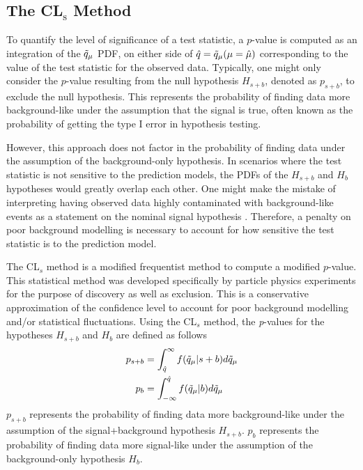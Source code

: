 \subsection{The CL$_{\mathrm{s}}$ Method}

To quantify the level of significance of a test statistic, a $p$-value is computed as an integration of the $\Tilde{q}_{\mu}$ PDF, on either side of $\hat{q} = \Tilde{q}_{\mu}(\mu = \hat{\mu}) $ corresponding to the value of the test statistic for the observed data.
Typically, one might only consider the $p$-value resulting from the null hypothesis $H_{s+b}$, denoted as $p_{s+b}$, to exclude the null hypothesis.
This represents the probability of finding data more background-like under the assumption that the signal is true, often known as the probability of getting the type I error in hypothesis testing.



However, this approach does not factor in the probability of finding data under the assumption of the background-only hypothesis.
In scenarios where the test statistic is not sensitive to the prediction models, the PDFs of the $H_{s+b}$ and $H_b$ hypotheses would greatly overlap each other.
One might make the mistake of interpreting having observed data highly contaminated with background-like events as a statement on the nominal signal hypothesis \cite{CLs_Read}.
Therefore, a penalty on poor background modelling is necessary to account for how sensitive the test statistic is to the prediction model.

The CL$_s$ method is a modified frequentist method to compute a modified $p$-value.
This statistical method was developed specifically by particle physics experiments for the purpose of discovery as well as exclusion. This is a conservative approximation of the confidence level to account for poor background modelling and/or statistical fluctuations.
Using the CL$_{s}$ method, the \textit{p}-values for the hypotheses $H_{s+b}$ and $H_b$ are defined as follows \cite{asymptotic_test, CLs_Junk, CLs_Read}
\begin{align}
\label{eq:psb}
    p_{s+b} & = \int_{\hat{q}}^{\infty} f(\Tilde{q}_\mu|s+b) d\Tilde{q}_\mu \\
\label{eq:pb}
    p_{b} & = \int^{\hat{q}}_{-\infty} f(\Tilde{q}_\mu|b) d\Tilde{q}_\mu
\end{align}
$p_{s+b}$ represents the probability of finding data more background-like under the assumption of the signal+background hypothesis $H_{s+b}$.
$p_b$ represents the probability of finding data more signal-like under the assumption of the background-only hypothesis $H_b$.

